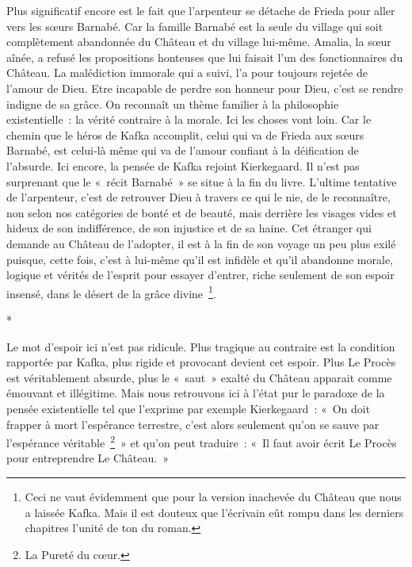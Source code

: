 \documentclass{book}
\begin{document}
Plus significatif encore est le fait que l'arpenteur se détache de Frieda pour aller vers les sœurs Barnabé. Car la famille Barnabé est la seule du village qui soit complètement abandonnée du Château et du village lui‑même. Amalia, la sœur aînée, a refusé les propositions honteuses que lui faisait l'un des fonctionnaires du Château. La malédiction immorale qui a suivi, l'a pour toujours rejetée de l'amour de Dieu. Etre incapable de perdre son honneur pour Dieu, c'est se rendre indigne de sa grâce. On reconnaît un thème familier à la philosophie existentielle : la vérité contraire à la morale. Ici les choses vont loin. Car le chemin que le héros de Kafka accomplit, celui qui va de Frieda aux sœurs Barnabé, est celui‑là même qui va de l'amour confiant à la déification de l'absurde. Ici encore, la pensée de Kafka rejoint Kierkegaard. Il n'est pas surprenant que le « récit Barnabé » se situe à la fin du livre. L'ultime tentative de l'arpenteur, c'est de retrouver Dieu à travers ce qui le nie, de le reconnaître, non selon nos catégories de bonté et de beauté, mais derrière les visages vides et hideux de son indifférence, de son injustice et de sa haine. Cet étranger qui demande au Château de l'adopter, il est à la fin de son voyage un peu plus exilé puisque, cette fois, c'est à lui-même qu'il est infidèle et qu'il abandonne morale, logique et vérités de l'esprit pour essayer d'entrer, riche seulement de son espoir insensé, dans le désert de la grâce divine \footnote{Ceci ne vaut évidemment que pour la version inachevée du Château que nous a laissée Kafka. Mais il est douteux que l'écrivain eût rompu dans les derniers chapitres l'unité de ton du roman.}.

\begin{center}
*
\end{center}

Le mot d'espoir ici n'est pas ridicule. Plus tragique au contraire est la condition rapportée par Kafka, plus rigide et provocant devient cet espoir. Plus Le Procès est véritablement absurde, plus le « saut » exalté du Château apparait comme émouvant et illégitime. Mais nous retrouvons ici à l'état pur le paradoxe de la pensée existentielle tel que l'exprime par exemple Kierkegaard : « On doit frapper à mort l'espérance terrestre, c'est alors seulement qu'on se sauve par l'espérance véritable \footnote{La Pureté du cœur.} » et qu'on peut traduire : « Il faut avoir écrit Le Procès pour entreprendre Le Château. »
\end{document}
